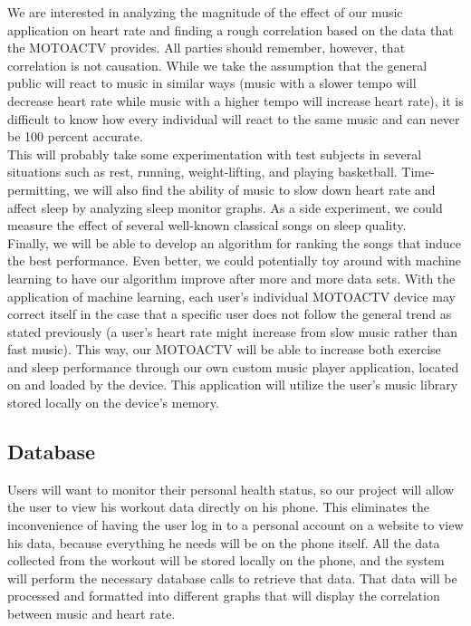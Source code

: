 \documentclass[letterpaper,english, 12pt]{scrreprt}
\begin{document}
We are interested in analyzing the magnitude of the effect of our music application on heart rate and finding a rough correlation based on the data that the MOTOACTV provides. All parties should remember, however, that correlation is not causation. While we take the assumption that the general public will react to music in similar ways (music with a slower tempo will decrease heart rate while music with a higher tempo will increase heart rate), it is difficult to know how every individual will react to the same music and can never be 100 percent accurate.\\

This will probably take some experimentation with test subjects in several situations such as rest, running, weight-lifting, and playing basketball. Time-permitting, we will also find the ability of music to slow down heart rate and affect sleep by analyzing sleep monitor graphs. As a side experiment, we could measure the effect of several well-known classical songs on sleep quality.\\
			 
Finally, we will be able to develop an algorithm for ranking the songs that induce the best performance. Even better, we could potentially toy around with machine learning to have our algorithm improve after more and more data sets. With the application of machine learning, each user's individual MOTOACTV device may correct itself in the case that a specific user does not follow the general trend as stated previously (a user's heart rate might increase from slow music rather than fast music). This way, our MOTOACTV will be able to increase both exercise and sleep performance through our own custom music player application, located on and loaded by the device. This application will utilize the user's music library stored locally on the device's memory.\\

\subsection{Database}
Users will want to monitor their personal health status, so our project will allow the user to view his workout data directly on his phone. This eliminates the inconvenience of having the user log in to a personal account on a website to view his data, because everything he needs will be on the phone itself. All the data collected from the workout will be stored locally on the phone, and the system will perform the necessary database calls to retrieve that data. That data will be processed and formatted into different graphs that will display the correlation between music and heart rate.\\
\end{document}

